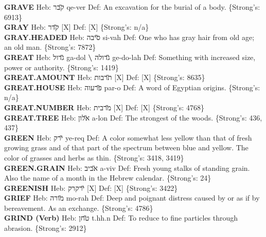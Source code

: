 {\textbf{GRAVE} Heb: {\large\H קבר} qe-ver Def: An excavation for the burial of a body. \{Strong's: 6913\}\hfill{}\\

\textbf{GRAY} Heb: {\large\H קדר} {[}X{]} Def: {[}X{]} \{Strong's: n/a\}\hfill{}\\

\textbf{GRAY.HEADED} Heb: {\large\H סיבה} si-vah Def: One who has gray hair from old age; an old man. \{Strong's: 7872\}\hfill{}\\

\textbf{GREAT} Heb: {\large\H גדול} ga-dol \textbf{\textbackslash{}} {\large\H גדולה} ge-do-lah Def: Something with increased size, power or authority. \{Strong's: 1419\}\hfill{}\\

\textbf{GREAT.AMOUNT} Heb: {\large\H תרבות} {[}X{]} Def: {[}X{]} \{Strong's: 8635\}\hfill{}\\

\textbf{GREAT.HOUSE} Heb: {\large\H פרעוה} par-o Def: A word of Egyptian origins. \{Strong's: n/a\}\hfill{}\\

\textbf{GREAT.NUMBER} Heb: {\large\H מרבית} {[}X{]} Def: {[}X{]} \{Strong's: 4768\}\hfill{}\\

\textbf{GREAT.TREE} Heb: {\large\H אלון} a-lon Def: The strongest of the woods. \{Strong's: 436, 437\}\hfill{}\\

\textbf{GREEN} Heb: {\large\H ירק} ye-req Def: A color somewhat less yellow than that of fresh growing grass and of that part of the spectrum between blue and yellow. The color of grasses and herbs as thin. \{Strong's: 3418, 3419\}\hfill{}\\

\textbf{GREEN.GRAIN} Heb: {\large\H אביב} a-viv Def: Fresh young stalks of standing grain. Also the name of a month in the Hebrew calendar. \{Strong's: 24\}\hfill{}\\

\textbf{GREENISH} Heb: {\large\H ירקרק} {[}X{]} Def: {[}X{]} \{Strong's: 3422\}\hfill{}\\

\textbf{GRIEF} Heb: {\large\H מורה} mo-rah Def: Deep and poignant distress caused by or as if by bereavement. As an exchange. \{Strong's: 4786\}\hfill{}\\

\textbf{GRIND (Verb)} Heb: {\large\H טחן} t.hh.n Def: To reduce to fine particles through abrasion. \{Strong's: 2912\}\hfill{}\\

}
